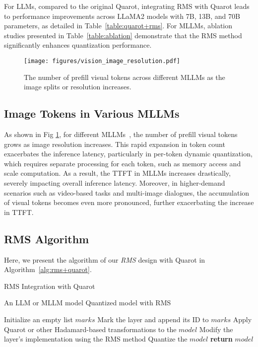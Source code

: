 For LLMs, compared to the original Quarot, integrating RMS with Quarot leads to performance improvements across LLaMA2 models with 7B, 13B, and 70B parameters, as detailed in Table~\ref{table:quarot+rms}. For MLLMs, ablation studies presented in Table~\ref{table:ablation} demonstrate that the RMS method significantly enhances quantization performance.


\begin{figure}[h]
    \centering    
    \texttt{[image: figures/vision\_image\_resolution.pdf]}
    \vspace{-2.6mm}
    \caption{The number of prefill visual tokens across different MLLMs as the image splits or resolution increases.} 
    \label{fig:obs_reso}
\vspace{-3mm}
\end{figure}

\subsection{Image Tokens in Various MLLMs} 
As shown in Fig \ref{fig:obs_reso}, for different MLLMs~\citep{qwenvl,Qwen2VL,yao2024minicpmv,chen2024internvl}, the number of prefill visual tokens grows as image resolution increases. This rapid expansion in token count exacerbates the inference latency, particularly in per-token dynamic quantization, which requires separate processing for each token, such as memory access and scale computation. As a result, the TTFT in MLLMs increases drastically, severely impacting overall inference latency. Moreover, in higher-demand scenarios such as video-based tasks and multi-image dialogues, the accumulation of visual tokens becomes even more pronounced, further exacerbating the increase in TTFT.

\subsection{RMS Algorithm}
\label{RMS_algo}
Here, we present the algorithm of our \emph{RMS} design with Quarot in Algorithm~\ref{alg:rms+quarot}.

\begin{algorithm}
\small
\caption{RMS Integration with Quarot}
\label{alg:rms+quarot}
\begin{algorithmic}[1]
    \REQUIRE An LLM or MLLM model
    \ENSURE Quantized model with RMS
    
    \STATE Initialize an empty list $marks$
            \STATE Mark the layer and append its ID to $marks$
        \ENDIF
    \ENDFOR
    \STATE Apply Quarot or other Hadamard-based transformations to the $model$
        \STATE Modify the layer's implementation using the RMS method
    \ENDFOR
    \STATE Quantize the $model$
    \STATE \textbf{return} $model$
\end{algorithmic}
\end{algorithm}

